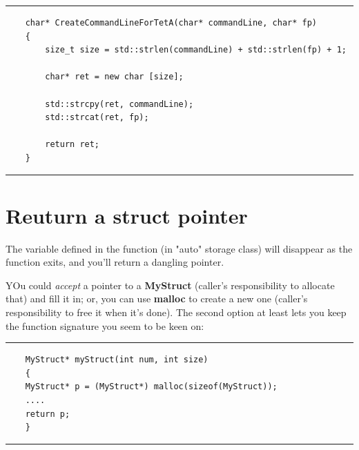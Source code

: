 	\noindent\vspace{1em}\hrule
	\begin{verbatim}
	char* CreateCommandLineForTetA(char* commandLine, char* fp)
	{
	    size_t size = std::strlen(commandLine) + std::strlen(fp) + 1;
	
	    char* ret = new char [size];
	
	    std::strcpy(ret, commandLine);
	    std::strcat(ret, fp);
	
	    return ret;
	}
	\end{verbatim}
	\noindent\hrule\vspace{1em}
	
	\section{Reuturn a struct pointer}
	The variable defined in the function (in "auto" storage class) will disappear as the function exits, and you'll return a dangling pointer.
	
	YOu could \textit{accept} a pointer to a \textbf{MyStruct} (caller's responsibility to allocate that) and fill it in; or, you can use \textbf{malloc} to create a new one (caller's responsibility to free it when it's done). The second option at least lets you keep the function signature you seem to be keen on:
	
	\noindent\vspace{1em}\hrule
	\begin{verbatim}
	MyStruct* myStruct(int num, int size)
	{
	MyStruct* p = (MyStruct*) malloc(sizeof(MyStruct));
	....
	return p;
	}
	\end{verbatim}
	\noindent\hrule\vspace{1em}
